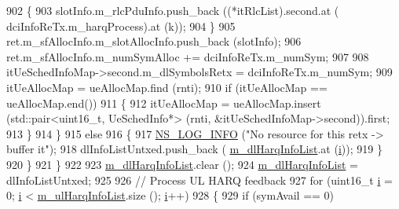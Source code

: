 \begin{DoxyCode}
902                                         \{
903                                                 slotInfo.m\_rlcPduInfo.push\_back ((*itRlcList).second.at (
      dciInfoReTx.m\_harqProcess).at (k));
904                                         \}
905                                         ret.m\_sfAllocInfo.m\_slotAllocInfo.push\_back (slotInfo);
906                                         ret.m\_sfAllocInfo.m\_numSymAlloc += dciInfoReTx.m\_numSym;
907 
908                                         itUeSchedInfoMap->second.m\_dlSymbolsRetx = dciInfoReTx.m\_numSym;
909                                         itUeAllocMap = ueAllocMap.find (rnti);
910                                         \textcolor{keywordflow}{if} (itUeAllocMap == ueAllocMap.end())
911                                         \{
912                                                 itUeAllocMap = ueAllocMap.insert (std::pair<uint16\_t,
       UeSchedInfo*> (rnti, &itUeSchedInfoMap->second)).first;
913                                         \}
914                                 \}
915                                 \textcolor{keywordflow}{else}
916                                 \{
917                                         \hyperlink{group__logging_gafbd73ee2cf9f26b319f49086d8e860fb}{NS\_LOG\_INFO} (\textcolor{stringliteral}{"No resource for this retx -> buffer it"});
918                                         dlInfoListUntxed.push\_back (
      \hyperlink{classns3_1_1MmWaveFlexTtiMaxWeightMacScheduler_afcc7ec068937dbf27338c5ed6a7a2f77}{m\_dlHarqInfoList}.at (\hyperlink{bernuolliDistribution_8m_a6f6ccfcf58b31cb6412107d9d5281426}{i}));
919                                 \}
920                         \}
921                 \}
922 
923                 \hyperlink{classns3_1_1MmWaveFlexTtiMaxWeightMacScheduler_afcc7ec068937dbf27338c5ed6a7a2f77}{m\_dlHarqInfoList}.clear ();
924                 \hyperlink{classns3_1_1MmWaveFlexTtiMaxWeightMacScheduler_afcc7ec068937dbf27338c5ed6a7a2f77}{m\_dlHarqInfoList} = dlInfoListUntxed;
925 
926                 \textcolor{comment}{// Process UL HARQ feedback}
927                 \textcolor{keywordflow}{for} (uint16\_t \hyperlink{bernuolliDistribution_8m_a6f6ccfcf58b31cb6412107d9d5281426}{i} = 0; \hyperlink{bernuolliDistribution_8m_a6f6ccfcf58b31cb6412107d9d5281426}{i} < \hyperlink{classns3_1_1MmWaveFlexTtiMaxWeightMacScheduler_ad0c6ce6c255be4838fe693c7c1934598}{m\_ulHarqInfoList}.size (); 
      \hyperlink{bernuolliDistribution_8m_a6f6ccfcf58b31cb6412107d9d5281426}{i}++)
928                 \{
929                         \textcolor{keywordflow}{if} (symAvail == 0)

\end{DoxyCode}
